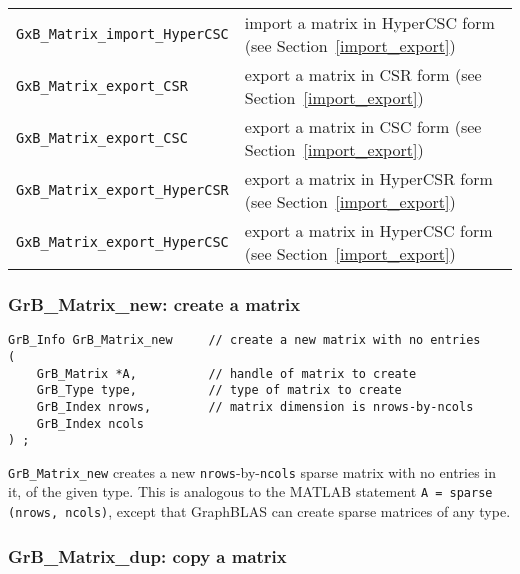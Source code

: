 \documentclass[12pt]{article}
\begin{document}
{\begin{tabular}{ll}
\verb'GxB_Matrix_import_HyperCSC'       & import a matrix in HyperCSC form
                                          (see Section~\ref{import_export})\\
\verb'GxB_Matrix_export_CSR'            & export a matrix in CSR form
                                          (see Section~\ref{import_export})\\
\verb'GxB_Matrix_export_CSC'            & export a matrix in CSC form
                                          (see Section~\ref{import_export})\\
\verb'GxB_Matrix_export_HyperCSR'       & export a matrix in HyperCSR form
                                          (see Section~\ref{import_export})\\
\verb'GxB_Matrix_export_HyperCSC'       & export a matrix in HyperCSC form
                                          (see Section~\ref{import_export})\\
\hline
\end{tabular}
}
\vspace{0.2in}

\subsubsection{{\sf GrB\_Matrix\_new:}          create a matrix}
\label{matrix_new}

\begin{mdframed}[userdefinedwidth=6in]
{\footnotesize
\begin{verbatim}
GrB_Info GrB_Matrix_new     // create a new matrix with no entries
(
    GrB_Matrix *A,          // handle of matrix to create
    GrB_Type type,          // type of matrix to create
    GrB_Index nrows,        // matrix dimension is nrows-by-ncols
    GrB_Index ncols
) ;
\end{verbatim} } \end{mdframed}

\verb'GrB_Matrix_new' creates a new \verb'nrows'-by-\verb'ncols' sparse matrix
with no entries in it, of the given type.  This is analogous to the MATLAB
statement \verb'A = sparse (nrows, ncols)', except that GraphBLAS can create
sparse matrices of any type.

\subsubsection{{\sf GrB\_Matrix\_dup:}          copy a matrix}
\label{matrix_dup}
\end{document}
